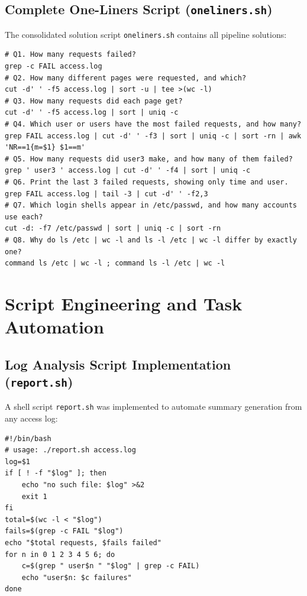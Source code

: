\documentclass[12pt,a4paper]{article}
\begin{document}
\subsection{Complete One-Liners Script (\texttt{oneliners.sh})}
The consolidated solution script \texttt{oneliners.sh} contains all pipeline solutions:

\begin{lstlisting}[style=bashstyle, caption={Contents of oneliners.sh}]
# Q1. How many requests failed?
grep -c FAIL access.log
# Q2. How many different pages were requested, and which?
cut -d' ' -f5 access.log | sort -u | tee >(wc -l)
# Q3. How many requests did each page get?
cut -d' ' -f5 access.log | sort | uniq -c
# Q4. Which user or users have the most failed requests, and how many?
grep FAIL access.log | cut -d' ' -f3 | sort | uniq -c | sort -rn | awk 'NR==1{m=$1} $1==m'
# Q5. How many requests did user3 make, and how many of them failed?
grep ' user3 ' access.log | cut -d' ' -f4 | sort | uniq -c
# Q6. Print the last 3 failed requests, showing only time and user.
grep FAIL access.log | tail -3 | cut -d' ' -f2,3
# Q7. Which login shells appear in /etc/passwd, and how many accounts use each?
cut -d: -f7 /etc/passwd | sort | uniq -c | sort -rn
# Q8. Why do ls /etc | wc -l and ls -l /etc | wc -l differ by exactly one?
command ls /etc | wc -l ; command ls -l /etc | wc -l
\end{lstlisting}

\section{Script Engineering and Task Automation}

\subsection{Log Analysis Script Implementation (\texttt{report.sh})}
A shell script \texttt{report.sh} was implemented to automate summary generation from any access log:

\begin{lstlisting}[style=bashstyle, caption={The report.sh script implementation}]
#!/bin/bash
# usage: ./report.sh access.log
log=$1
if [ ! -f "$log" ]; then
    echo "no such file: $log" >&2
    exit 1
fi
total=$(wc -l < "$log")
fails=$(grep -c FAIL "$log")
echo "$total requests, $fails failed"
for n in 0 1 2 3 4 5 6; do
    c=$(grep " user$n " "$log" | grep -c FAIL)
    echo "user$n: $c failures"
done
\end{lstlisting}
\end{document}

